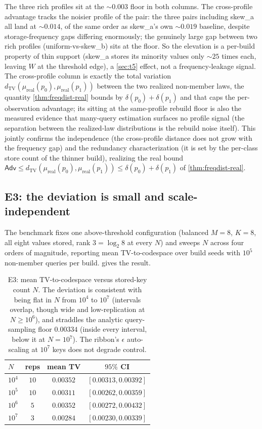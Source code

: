 \documentclass[sigconf,nonacm,anonymous,balance=false]{acmart}
\newcommand{\TV}{d_{\mathrm{TV}}}
\newcommand{\W}{W}                          %
\newcommand{\Adv}{\mathsf{Adv}}             %
\newcommand{\lawreal}{\mu_{\mathrm{real}}}  %
\begin{document}
The three rich profiles sit at the $\sim 0.003$ floor in both columns. The cross-profile
advantage tracks the noisier profile of the pair: the three pairs including skew\_a all
land at $\sim 0.014$, of the same order as skew\_a's own $\sim 0.019$ baseline, despite
storage-frequency gaps differing enormously; the genuinely large gap between two rich
profiles (uniform-vs-skew\_b) sits at the floor. So the elevation is a per-build property
of thin support (skew\_a stores its minority values only $\sim 25$ times each, leaving $\W$
at the threshold edge), a \cref{sec:t5} effect, not a frequency-leakage signal. The
cross-profile column is exactly the total variation $\TV(\lawreal(p_0), \lawreal(p_1))$
between the two realized non-member laws, the quantity \cref{thm:freqdist-real} bounds by
$\delta(p_0)+\delta(p_1)$ and that caps the per-observation advantage; its sitting at the
same-profile rebuild floor is also the measured evidence that many-query estimation
surfaces no profile signal (the separation between the realized-law distributions is the
rebuild noise itself).
This jointly confirms the independence (the cross-profile distance does not grow with the
frequency gap) and the redundancy characterization (it is set by the per-class store count
of the thinner build), realizing the real bound
$\Adv \le \TV(\lawreal(p_0), \lawreal(p_1)) \le \delta(p_0)+\delta(p_1)$ of
\cref{thm:freqdist-real}.

\subsection{E3: the deviation is small and scale-independent}

The benchmark fixes one above-threshold configuration (balanced $M = 8$, $K = 8$, all
eight values stored, rank $3 = \log_2 8$ at every $N$) and sweeps $N$ across four orders of
magnitude, reporting mean TV-to-codespace over build seeds with $10^5$ non-member queries
per build.  gives the result.

\begin{table}[t]
  \centering
  \caption{E3: mean TV-to-codespace versus stored-key count $N$. The deviation is consistent
  with being flat in $N$ from $10^4$ to $10^7$ (intervals overlap, though wide and
  low-replication at $N \ge 10^6$), and straddles the analytic query-sampling floor $0.00334$
  (inside every interval, below it at $N = 10^7$). The ribbon's $\epsilon$ auto-scaling at
  $10^7$ keys does not degrade control.}
  \label{tab:e3}
  \begin{tabular}{lccc}
    \toprule
    $N$ & reps & mean TV & $95\%$ CI \\
    \midrule
    $10^4$ & $10$ & $0.00352$ & $[0.00313, 0.00392]$ \\
    $10^5$ & $10$ & $0.00311$ & $[0.00262, 0.00359]$ \\
    $10^6$ & $5$  & $0.00352$ & $[0.00272, 0.00432]$ \\
    $10^7$ & $3$  & $0.00284$ & $[0.00230, 0.00339]$ \\
    \bottomrule
  \end{tabular}
\end{table}
\end{document}
